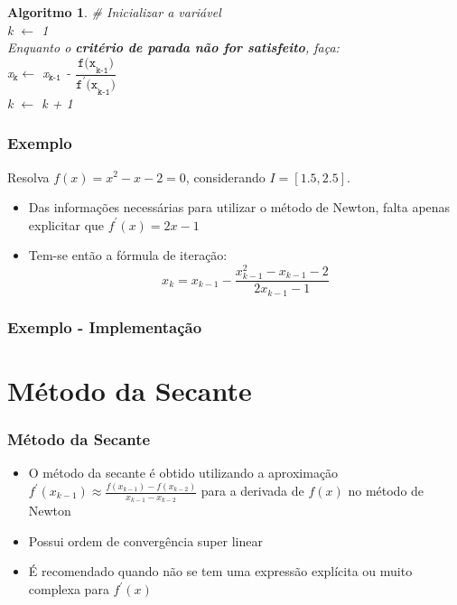 \documentclass{beamer}
\theoremstyle{mystyle}
\newtheorem{algoritmo}[theorem]{Algoritmo}
\begin{document}
\begin{frame}
	\begin{algoritmo}
		\# Inicializar a variável\\
		k $\leftarrow$ 1\\
		Enquanto o \textbf{critério de parada não for satisfeito}, faça:\\
		\quad x$ _{\texttt{k}} \leftarrow$ x$ _{\texttt{k-1}} $ - $ \dfrac{\texttt{f(x}_{\texttt{k-1}} \texttt{)}}{\texttt{f}^{\prime}\texttt{(x}_{\texttt{k-1}} \texttt{)}} $ \\
		\quad k $\leftarrow$ k + 1
	\end{algoritmo}
\end{frame}

\begin{frame}
	\frametitle{Exemplo}
	Resolva $ f (x) = x^{2} - x - 2 = 0 $, considerando $ I = [1.5, 2.5] $.
	\pause
	
	\begin{itemize}
		\item Das informações necessárias para utilizar o método de Newton, falta apenas explicitar que $ f^{\prime}(x) = 2x - 1 $
		\item Tem-se então a fórmula de iteração:
		\begin{equation*}
			x_{k} = x_{k - 1} - \frac{x_{k - 1}^{2} - x_{k - 1} - 2}{2x_{k - 1} - 1}
		\end{equation*}
	\end{itemize}
\end{frame}

\begin{frame}
	\frametitle{Exemplo - Implementação}
	\centering
	\href{https://colab.research.google.com/drive/1OnVWIXh918bJg1vS8VZVvc5EM-MrwY2c?usp=sharing}{}
\end{frame}

\section{Método da Secante}

\begin{frame}
	\frametitle{Método da Secante}
	\begin{itemize}
		\item O método da secante é obtido utilizando a aproximação $ f^{\prime}(x_{k - 1}) \approx \frac{f(x_{k - 1}) - f(x_{k - 2})}{x_{k - 1} - x_{k - 2}} $ para a derivada de $ f(x) $ no método de Newton
		\item Possui ordem de convergência super linear
		\item É recomendado quando não se tem uma expressão explícita ou muito complexa para $ f^{\prime}(x) $
	\end{itemize}	
\end{frame}
\end{document}
